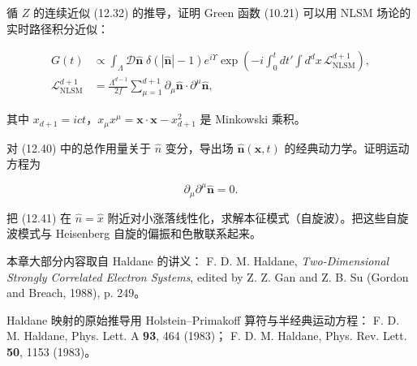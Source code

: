 \begin{exercises}

\item 循 $Z$ 的连续近似 (12.32) 的推导，证明 Green 函数 (10.21) 可以用 NLSM 场论的实时路径积分近似：

\begin{align*}
G ( t ) & \propto \int_{\Lambda} \mathcal {D} \hat {\mathbf {n}} \; \delta \left( | \hat {\mathbf {n}} | - 1 \right) e ^ {i \Upsilon} \exp \left( - i \int_ {0} ^ {t} d t ' \int d ^ {d} x \, \mathcal {L}_{\mathrm{NLSM}} ^ {d + 1} \right) ,\\
\mathcal {L}_{\mathrm{NLSM}} ^ {d + 1} & = \frac {\Lambda^ {d - 1}}{2 f} \sum_ {\mu = 1} ^ {d + 1} \partial_ {\mu} \hat {\mathbf {n}} \cdot \partial^ {\mu} \hat {\mathbf {n}} ,
\tag{12.40}
\end{align*}

其中 $x_{d+1} = ict$，$x_{\mu}x^{\mu} = \mathbf{x} \cdot \mathbf{x} - x_{d+1}^{2}$ 是 Minkowski 乘积。

\item 对 (12.40) 中的总作用量关于 $\hat{n}$ 变分，导出场 $\hat{\mathbf{n}}(\mathbf{x},t)$ 的经典动力学。证明运动方程为

\begin{equation*}
\partial_ {\mu} \partial^ {\mu} \hat {\mathbf {n}} = 0.
\tag{12.41}
\end{equation*}

把 (12.41) 在 $\hat{n} = \hat{x}$ 附近对小涨落线性化，求解本征模式（自旋波）。把这些自旋波模式与 Heisenberg 自旋的偏振和色散联系起来。

\end{exercises}

\begin{chapbib}
\item 本章大部分内容取自 Haldane 的讲义：
  F. D. M. Haldane, \textit{Two-Dimensional Strongly Correlated Electron Systems}, edited by Z. Z. Gan and Z. B. Su (Gordon and Breach, 1988), p. 249。
\item Haldane 映射的原始推导用 Holstein--Primakoff 算符与半经典运动方程：
  F. D. M. Haldane, Phys. Lett. A \textbf{93}, 464 (1983)；
  F. D. M. Haldane, Phys. Rev. Lett. \textbf{50}, 1153 (1983)。
\end{chapbib}
